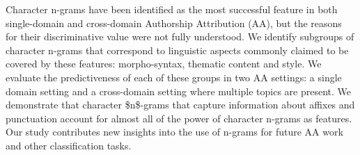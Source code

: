 Character n-grams have been identified as the most successful feature in both single-domain and cross-domain Authorship Attribution (AA), but the reasons for their discriminative value were not fully understood. We identify subgroups of character n-grams that correspond to linguistic aspects commonly claimed to be covered by these features: morpho-syntax, thematic content and style. We evaluate the predictiveness of each of these groups in two AA settings: a single domain setting and a cross-domain setting where multiple topics are present. We demonstrate that character \$n\$-grams that capture information about affixes and punctuation account for almost all of the power of character n-grams as features. Our study contributes new insights into the use of n-grams for future AA work and other classification tasks.
